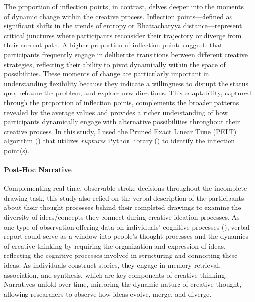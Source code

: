 \documentclass[../MA_Thesis.tex]{subfiles}
\begin{document}
The proportion of inflection points, in contrast, delves deeper into the moments of dynamic change within the creative process. Inflection points—defined as significant shifts in the trends of entropy or Bhattacharyya distance—represent critical junctures where participants reconsider their trajectory or diverge from their current path. A higher proportion of inflection points suggests that participants frequently engage in deliberate transitions between different creative strategies, reflecting their ability to pivot dynamically within the space of possibilities. These moments of change are particularly important in understanding flexibility because they indicate a willingness to disrupt the status quo, reframe the problem, and explore new directions. This adaptability, captured through the proportion of inflection points, complements the broader patterns revealed by the average values and provides a richer understanding of how participants dynamically engage with alternative possibilities throughout their creative process. In this study, I used the Pruned Exact Linear Time (PELT) algorithm (\cite{dorcas_wambui_power_2015}) that utilizes \textit{ruptures} Python library (\cite{truong_selective_2020}) to identify the inflection point(s).

\paragraph*{Post-Hoc Narrative}
Complementing real-time, observable stroke decisions throughout the incomplete drawing task, this study also relied on the verbal description of the participants about their thought processes behind their completed drawings to examine the diversity of ideas/concepts they connect during creative ideation processes. As one type of observation offering data on individuals' cognitive processes (\cite{ericsson_verbal_2003}), verbal report could serve as a window into people's thought processes and the dynamics of creative thinking by requiring the organization and expression of ideas, reflecting the cognitive processes involved in structuring and connecting these ideas. As individuals construct stories, they engage in memory retrieval, association, and synthesis, which are key components of creative thinking. Narratives unfold over time, mirroring the dynamic nature of creative thought, allowing researchers to observe how ideas evolve, merge, and diverge.
\end{document}
